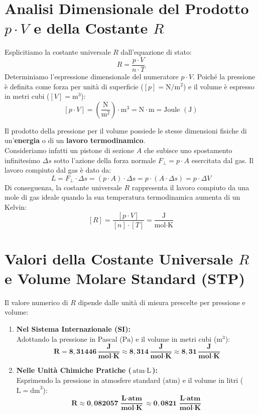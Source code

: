 \documentclass[11pt,a4paper,oneside]{report}
\begin{document}
\section{Analisi Dimensionale del Prodotto $p \cdot V$ e della Costante $R$}

Esplicitiamo la costante universale $R$ dall'equazione di stato:
\[
R = \frac{p \cdot V}{n \cdot T}
\]
Determiniamo l'espressione dimensionale del numeratore $p \cdot V$. Poich\'e la pressione \`e definita come forza per unit\`a di superficie ($[p] = \text{N}/\text{m}^2$) e il volume \`e espresso in metri cubi ($[V] = \text{m}^3$):
\[
[p \cdot V] = \left(\frac{\text{N}}{\text{m}^2}\right) \cdot \text{m}^3 = \text{N} \cdot \text{m} = \text{Joule } (\text{J})
\]
\begin{commento}
Il prodotto della pressione per il volume possiede le stesse dimensioni fisiche di un'\textbf{energia} o di un \textbf{lavoro termodinamico}.\\
Consideriamo infatti un pistone di sezione $A$ che subisce uno spostamento infinitesimo $\Delta s$ sotto l'azione della forza normale $F_{\perp} = p \cdot A$ esercitata dal gas. Il lavoro compiuto dal gas \`e dato da:
\[
L = F_{\perp} \cdot \Delta s = (p \cdot A) \cdot \Delta s = p \cdot (A \cdot \Delta s) = p \cdot \Delta V
\]
Di conseguenza, la costante universale $R$ rappresenta il lavoro compiuto da una mole di gas ideale quando la sua temperatura termodinamica aumenta di un Kelvin:
\[
[R] = \frac{[p \cdot V]}{[n] \cdot [T]} = \frac{\text{J}}{\text{mol} \cdot \text{K}}
\]
\end{commento}

\section{Valori della Costante Universale $R$ e Volume Molare Standard (STP)}

Il valore numerico di $R$ dipende dalle unit\`a di misura prescelte per pressione e volume:

\begin{enumerate}
  \item \textbf{Nel Sistema Internazionale (SI):}\\
  Adottando la pressione in Pascal ($\text{Pa}$) e il volume in metri cubi ($\text{m}^3$):
  \[
  \bm{R = 8{,}31446\,\frac{\text{J}}{\text{mol}\cdot\text{K}} \approx 8{,}314\,\frac{\text{J}}{\text{mol}\cdot\text{K}} \approx 8{,}31\,\frac{\text{J}}{\text{mol}\cdot\text{K}}}
  \]
  
  \item \textbf{Nelle Unit\`a Chimiche Pratiche ($\text{atm} \cdot \text{L}$):}\\
  Esprimendo la pressione in atmosfere standard ($\text{atm}$) e il volume in litri ($\text{L} = \text{dm}^3$):
  \[
  \bm{R \approx 0{,}082057\,\frac{\text{L}\cdot\text{atm}}{\text{mol}\cdot\text{K}} \approx 0{,}0821\,\frac{\text{L}\cdot\text{atm}}{\text{mol}\cdot\text{K}}}
  \]
\end{enumerate}
\end{document}
